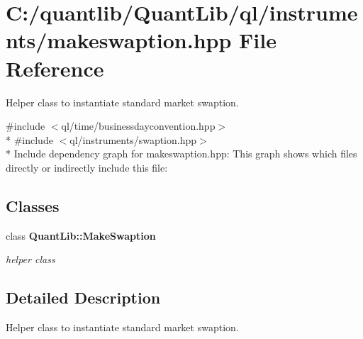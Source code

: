 \section{C\+:/quantlib/\+Quant\+Lib/ql/instruments/makeswaption.hpp File Reference}
\label{makeswaption_8hpp}


Helper class to instantiate standard market swaption.  


{\ttfamily \#include $<$ql/time/businessdayconvention.\+hpp$>$}\\*
{\ttfamily \#include $<$ql/instruments/swaption.\+hpp$>$}\\*
Include dependency graph for makeswaption.\+hpp\+:
This graph shows which files directly or indirectly include this file\+:
\subsection*{Classes}
\begin{DoxyCompactItemize}
\item 
class {\bf Quant\+Lib\+::\+Make\+Swaption}
\begin{DoxyCompactList}\small\item\em helper class \end{DoxyCompactList}\end{DoxyCompactItemize}


\subsection{Detailed Description}
Helper class to instantiate standard market swaption. 

